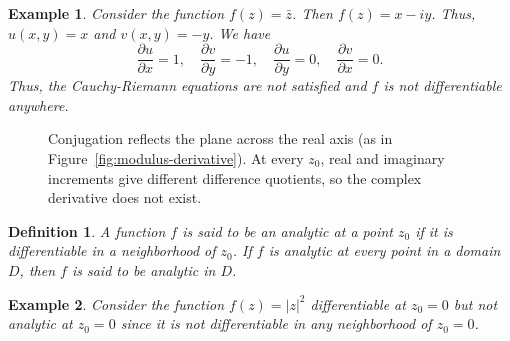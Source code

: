 \documentclass{report}
\newtheorem{definition}{Definition}
\newtheorem{example}{Example}
\begin{document}
\begin{example}
    Consider the function $f(z) = \bar{z}$. Then $f(z) = x - iy$. Thus, $u(x,y) = x$ and $v(x,y) = -y$. We have
    \[
        \frac{\partial u}{\partial x} = 1, \quad \frac{\partial v}{\partial y} = -1, \quad \frac{\partial u}{\partial y} = 0, \quad \frac{\partial v}{\partial x} = 0.
    \]
    Thus, the Cauchy-Riemann equations are not satisfied and $f$ is not differentiable anywhere.
\end{example}

\begin{figure}[H]
    \centering
    \caption{Conjugation reflects the plane across the real axis (as in Figure~\ref{fig:modulus-derivative}). At every $z_0$, real and imaginary increments give different difference quotients, so the complex derivative does not exist.}
    \label{fig:conjugation}
\end{figure}



\begin{definition}
    A function $f$ is said to be an analytic at a point $z_0$ if it is differentiable in a neighborhood of $z_0$. 
    If $f$ is analytic at every point in a domain $D$, then $f$ is said to be analytic in $D$.
\end{definition}



\begin{example}
    Consider the function $f(z) = |z|^2$ differentiable at $z_0 = 0$ but not analytic at $z_0 = 0$ since it is not differentiable in any neighborhood of $z_0 = 0$.
\end{example}
\end{document}
